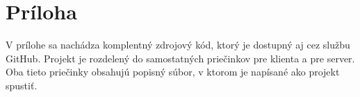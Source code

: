 \chapter*{Príloha} %

V prílohe sa nachádza komplentný zdrojový kód, ktorý je dostupný aj cez službu GitHub. Projekt
je rozdelený do samostatných priečinkov pre klienta a pre server. Oba tieto priečinky obsahujú 
popisný súbor, v ktorom je napísané ako projekt spustiť.
